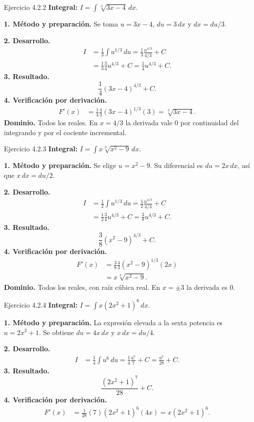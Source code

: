 \begin{examplebox}{Ejercicio 4.2.2}
\textbf{Integral:} $\displaystyle I=\int \sqrt[3]{3x-4}\,dx$.

\textbf{1. Método y preparación.} Se toma $u=3x-4$, $du=3\,dx$ y $dx=du/3$.

\textbf{2. Desarrollo.}
\begin{align*}
I&=\frac13\int u^{1/3}\,du=\frac13\frac{u^{4/3}}{4/3}+C\\&=\frac13\frac34u^{4/3}+C=\frac14u^{4/3}+C.
\end{align*}
\textbf{3. Resultado.}
\[
\frac14(3x-4)^{4/3}+C.
\]
\textbf{4. Verificación por derivación.}
\begin{align*}
F'(x)&=\frac14\frac43(3x-4)^{1/3}(3)=\sqrt[3]{3x-4}.
\end{align*}
\textbf{Dominio.} Todos los reales. En $x=4/3$ la derivada vale $0$ por continuidad del integrando y por el cociente incremental.
\end{examplebox}

\begin{examplebox}{Ejercicio 4.2.3}
\textbf{Integral:} $\displaystyle I=\int x\sqrt[3]{x^2-9}\,dx$.

\textbf{1. Método y preparación.} Se elige $u=x^2-9$. Su diferencial es $du=2x\,dx$, así que $x\,dx=du/2$.

\textbf{2. Desarrollo.}
\begin{align*}
I&=\frac12\int u^{1/3}\,du=\frac12\frac{u^{4/3}}{4/3}+C\\&=\frac12\frac34u^{4/3}+C=\frac38u^{4/3}+C.
\end{align*}
\textbf{3. Resultado.}
\[
\frac38(x^2-9)^{4/3}+C.
\]
\textbf{4. Verificación por derivación.}
\begin{align*}
F'(x)&=\frac38\frac43(x^2-9)^{1/3}(2x)\\&=x\sqrt[3]{x^2-9}.
\end{align*}
\textbf{Dominio.} Todos los reales, con raíz cúbica real. En $x=\pm3$ la derivada es $0$.
\end{examplebox}

\begin{examplebox}{Ejercicio 4.2.4}
\textbf{Integral:} $\displaystyle I=\int x(2x^2+1)^6\,dx$.

\textbf{1. Método y preparación.} La expresión elevada a la sexta potencia es $u=2x^2+1$. Se obtiene $du=4x\,dx$ y $x\,dx=du/4$.

\textbf{2. Desarrollo.}
\begin{align*}
I&=\frac14\int u^6\,du=\frac14\frac{u^7}{7}+C=\frac{u^7}{28}+C.
\end{align*}
\textbf{3. Resultado.}
\[
\frac{(2x^2+1)^7}{28}+C.
\]
\textbf{4. Verificación por derivación.}
\begin{align*}
F'(x)&=\frac1{28}(7)(2x^2+1)^6(4x)=x(2x^2+1)^6.
\end{align*}
\end{examplebox}

